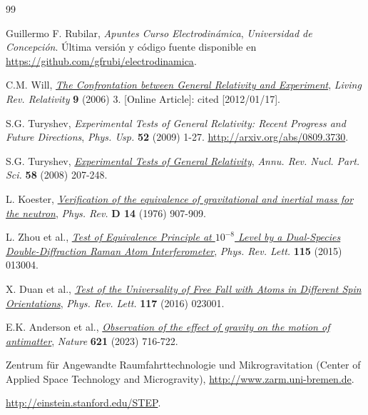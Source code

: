 \begin{thebibliography}{99}


Guillermo F. Rubilar,  \textit{Apuntes Curso Electrodinámica},  \textsl{
Universidad de Concepción}. Última versión y código fuente disponible en \url{https://github.com/gfrubi/electrodinamica}.

 C.M. Will, \href{http://www.livingreviews.org/lrr-2006-3} \textit{The Confrontation between General Relativity and Experiment},   \textsl{Living Rev. Relativity}   \textbf{9} (2006) 3. [Online Article]: cited [2012/01/17].

 S.G. Turyshev,  \textit{Experimental Tests of General Relativity: Recent Progress and Future Directions},   \textsl{Phys. Usp.}   \textbf{52} (2009) 1-27. \url{http://arxiv.org/abs/0809.3730}.

 S.G. Turyshev, \href{http://www.annualreviews.org/doi/abs/10.1146/annurev.nucl.58.020807.111839} \textit{Experimental Tests of General Relativity},   \textsl{Annu. Rev. Nucl. Part. Sci.}   \textbf{58} (2008) 207-248. 

 L. Koester, \href{http://dx.doi.org/10.1103/PhysRevD.14.907} \textit{Verification of the equivalence of gravitational and inertial mass for the neutron},   \textsl{Phys. Rev.}   \textbf{D 14} (1976) 907-909.

 L. Zhou et al., \href{http://dx.doi.org/10.1103/PhysRevLett.115.013004}{\textit{Test of Equivalence Principle at $10^{-8}$ Level by a Dual-Species Double-Diffraction Raman
Atom Interferometer}},   \textsl{Phys. Rev. Lett.}   \textbf{115} (2015) 013004.

 X. Duan et al., \href{http://dx.doi.org/10.1103/PhysRevLett.117.023001}{\textit{Test of the Universality of Free Fall with Atoms in Different Spin Orientations}},   \textsl{Phys. Rev. Lett.}   \textbf{117} (2016) 023001. 

 E.K. Anderson et al., \href{https://doi.org/10.1038/s41586-023-06527-1}{\textit{Observation of the effect of gravity on the motion of antimatter}}, \textsl{Nature} \textbf{621} (2023) 716-722.

 Zentrum f\"ur Angewandte Raumfahrttechnologie und Mikrogravitation (Center of Applied Space Technology and Microgravity), \url{http://www.zarm.uni-bremen.de}.

 \url{http://einstein.stanford.edu/STEP}.


\end{thebibliography}
